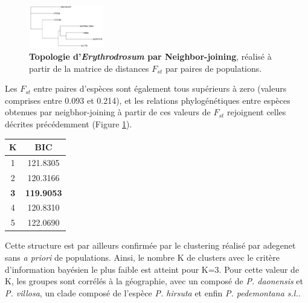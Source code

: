 \begin{figure}
	\vspace{-20pt}
	\begin{center}
	\includegraphics[width=0.29\textwidth]{fig/topologie.png}
	\end{center}
	\caption{\textbf{Topologie d'\textit{Erythrodrosum} par Neighbor-joining}, réalisé à partir de la matrice de distances $F_{st}$ par paires de populations.}
    \label{topologie}
\end{figure}

Les $F_{st}$ entre paires d'espèces sont également tous supérieurs à zero (valeurs comprises entre 0.093 et 0.214), et les relations phylogénétiques entre espèces obtenues par neigbhor-joining à partir de ces valeurs de $F_{st}$ rejoignent celles décrites précédemment (Figure \ref{topologie}).
\begin{table}
\vspace{-20pt}
\begin{tabular}{cc}\\\toprule  
K & BIC \\ \midrule
1 & 121.8305\\
2 & 120.3166\\
\textbf{3} & \textbf{119.9053}\\
4 & 120.8310\\
5 & 122.0690\\ \bottomrule
\end{tabular}
\label{BIC}
\vspace{-20pt}
\end{table}
Cette structure est par ailleurs confirmée par le clustering réalisé par adegenet sans \textit{a priori} de populations. Ainsi, le nombre K de clusters avec le critère d'information bayésien le plus faible \DIFdelbegin {}\DIFdelend est atteint pour K=3. 
Pour cette valeur de K, les groupes sont corrélés à la géographie, avec un  composé de \textit{P. daonensis} et \textit{P. villosa}, un clade composé de l'espèce \textit{P. hirsuta} et enfin \textit{P. pedemontana s.l.}.


